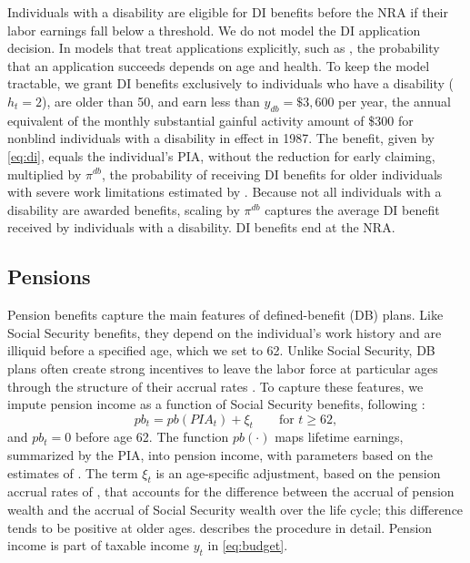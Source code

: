 Individuals with a disability are eligible for DI benefits before the NRA if their labor earnings fall below a threshold. We do not model the DI application decision. In models that treat applications explicitly, such as \citet{Low2015}, the probability that an application succeeds depends on age and health. To keep the model tractable, we grant DI benefits exclusively to individuals who have a disability ($h_t=2$), are older than 50, and earn less than $y_{db}=\$3{,}600$ per year, the annual equivalent of the monthly substantial gainful activity amount of \$300 for nonblind individuals with a disability in effect in 1987. The benefit, given by \eqref{eq:di}, equals the individual's PIA, without the reduction for early claiming, multiplied by $\pi^{db}$, the probability of receiving DI benefits for older individuals with severe work limitations estimated by \citet{Low2015}. Because not all individuals with a disability are awarded benefits, scaling by $\pi^{db}$ captures the average DI benefit received by individuals with a disability. DI benefits end at the NRA.

\subsection{Pensions}\label{app:model_pensions}

Pension benefits capture the main features of defined-benefit (DB) plans. Like Social Security benefits, they depend on the individual's work history and are illiquid before a specified age, which we set to 62. Unlike Social Security, DB plans often create strong incentives to leave the labor force at particular ages through the structure of their accrual rates \citep{Gustman2000,Ippolito1997}. To capture these features, we impute pension income as a function of Social Security benefits, following \citet{french2005effects}:
\begin{equation*}
pb_t=pb(PIA_t)+\xi_t \qquad \text{for } t\geq 62,
\end{equation*}
and $pb_t=0$ before age 62. The function $pb(\cdot)$ maps lifetime earnings, summarized by the PIA, into pension income, with parameters based on the estimates of \citet{Gustman1999}. The term $\xi_t$ is an age-specific adjustment, based on the pension accrual rates of \citet{Gustman2000}, that accounts for the difference between the accrual of pension wealth and the accrual of Social Security wealth over the life cycle; this difference tends to be positive at older ages. \citet{french2005effects} describes the procedure in detail. Pension income is part of taxable income $y_t$ in \eqref{eq:budget}.

